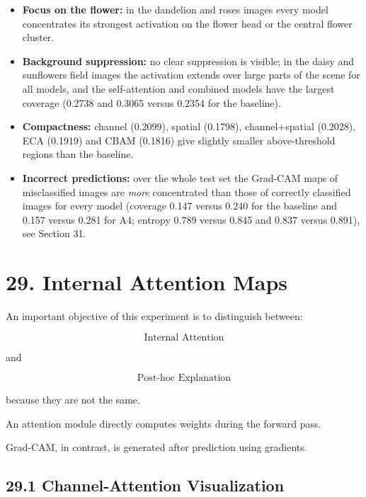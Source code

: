 \documentclass[10pt]{article}
\begin{document}
\begin{itemize}
\item \textbf{Focus on the flower:} in the dandelion and roses images every model concentrates its strongest activation on the flower head or the central flower cluster.
\item \textbf{Background suppression:} no clear suppression is visible; in the daisy and sunflowers field images the activation extends over large parts of the scene for all models, and the self-attention and combined models have the largest coverage (0.2738 and 0.3065 versus 0.2354 for the baseline).
\item \textbf{Compactness:} channel (0.2099), spatial (0.1798), channel+spatial (0.2028), ECA (0.1919) and CBAM (0.1816) give slightly smaller above-threshold regions than the baseline.
\item \textbf{Incorrect predictions:} over the whole test set the Grad-CAM maps of misclassified images are \emph{more} concentrated than those of correctly classified images for every model (coverage 0.147 versus 0.240 for the baseline and 0.157 versus 0.281 for A4; entropy 0.789 versus 0.845 and 0.837 versus 0.891), see Section 31.
\end{itemize}

\section*{29. Internal Attention Maps}

An important objective of this experiment is to distinguish between:

\[
\boxed{\text{Internal Attention}}
\]

and

\[
\boxed{\text{Post-hoc Explanation}}
\]

because they are not the same.

An attention module directly computes weights during the forward pass.

Grad-CAM, in contrast, is generated after prediction using gradients.

\subsection*{29.1 Channel-Attention Visualization}
\end{document}
